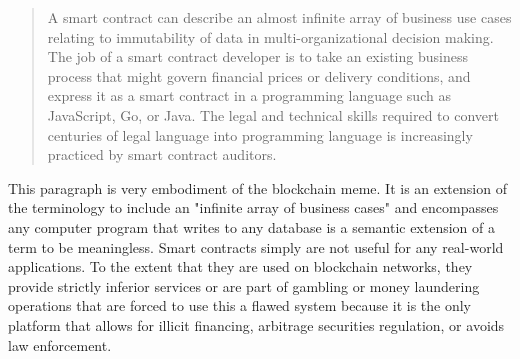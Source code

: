 \begin{quote}
A smart contract can describe an almost infinite array of business use
cases relating to immutability of data in multi-organizational decision
making. The job of a smart contract developer is to take an existing
business process that might govern financial prices or delivery
conditions, and express it as a smart contract in a programming language
such as JavaScript, Go, or Java. The legal and technical skills required
to convert centuries of legal language into programming language is
increasingly practiced by smart contract auditors.
\end{quote}

This paragraph is very embodiment of the blockchain meme. It is an extension of
the terminology to include an "infinite array of business cases" and encompasses
any computer program that writes to any database is a semantic extension of a
term to be meaningless. Smart contracts simply are not useful for any real-world
applications. To the extent that they are used on blockchain networks, they
provide strictly inferior services or are part of gambling or money laundering
operations that are forced to use this a flawed system because it is the only
platform that allows for illicit financing, arbitrage securities regulation, or
avoids law enforcement.
